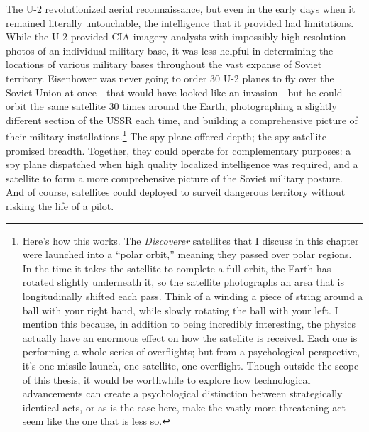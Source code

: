 \documentclass[11pt]{memoir}
\begin{document}
The U-2 revolutionized aerial reconnaissance, but even in the early days when it remained literally untouchable, the intelligence that it provided had limitations. While the U-2 provided CIA imagery analysts with impossibly high-resolution photos of an individual military base, it was less helpful in determining the locations of various military bases throughout the vast expanse of Soviet territory. Eisenhower was never going to order 30 U-2 planes to fly over the Soviet Union at once---that would have looked like an invasion---but he could orbit the same satellite 30 times around the Earth, photographing a slightly different section of the USSR each time, and building a comprehensive picture of their military installations.\footnote{Here's how this works. The \emph{Discoverer} satellites that I discuss in this chapter were launched into a ``polar orbit,'' meaning they passed over polar regions. In the time it takes the satellite to complete a full orbit, the Earth has rotated slightly underneath it, so the satellite photographs an area that is longitudinally shifted each pass. Think of a winding a piece of string around a ball with your right hand, while slowly rotating the ball with your left. I mention this because, in addition to being incredibly interesting, the physics actually have an enormous effect on how the satellite is received. Each one is performing a whole series of overflights; but from a psychological perspective, it's one missile launch, one satellite, one overflight. Though outside the scope of this thesis, it would be worthwhile to explore how technological advancements can create a psychological distinction between strategically identical acts, or as is the case here, make the vastly more threatening act seem like the one that is less so.} The spy plane offered depth; the spy satellite promised breadth. Together, they could operate for complementary purposes: a spy plane dispatched when high quality localized intelligence was required, and a satellite to form a more comprehensive picture of the Soviet military posture. And of course, satellites could deployed to surveil dangerous territory without risking the life of a pilot.
\end{document}
